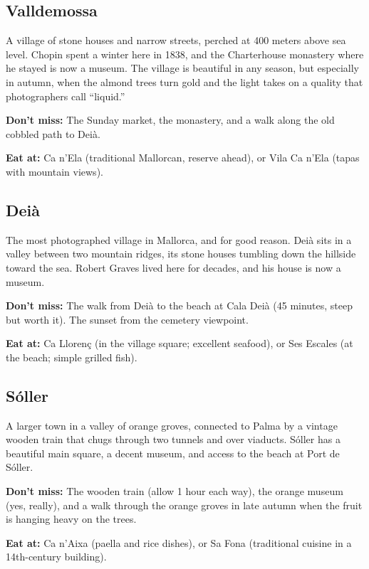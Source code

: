\documentclass[
    language=english,
    doctype=travel-guide,
    institution=none,
]{../../omnilatex}
\begin{document}
\subsection{Valldemossa}

A village of stone houses and narrow streets, perched at 400 meters above sea level. Chopin spent a winter here in 1838, and the Charterhouse monastery where he stayed is now a museum. The village is beautiful in any season, but especially in autumn, when the almond trees turn gold and the light takes on a quality that photographers call ``liquid.''

\textbf{Don't miss:} The Sunday market, the monastery, and a walk along the old cobbled path to Dei\`{a}.

\textbf{Eat at:} Ca n'Ela (traditional Mallorcan, reserve ahead), or Vila Ca n'Ela (tapas with mountain views).

\subsection{Dei\`{a}}

The most photographed village in Mallorca, and for good reason. Dei\`{a} sits in a valley between two mountain ridges, its stone houses tumbling down the hillside toward the sea. Robert Graves lived here for decades, and his house is now a museum.

\textbf{Don't miss:} The walk from Dei\`{a} to the beach at Cala Dei\`{a} (45 minutes, steep but worth it). The sunset from the cemetery viewpoint.

\textbf{Eat at:} Ca Lloren\c{c} (in the village square; excellent seafood), or Ses Escales (at the beach; simple grilled fish).

\subsection{S\'{o}ller}

A larger town in a valley of orange groves, connected to Palma by a vintage wooden train that chugs through two tunnels and over viaducts. S\'{o}ller has a beautiful main square, a decent museum, and access to the beach at Port de S\'{o}ller.

\textbf{Don't miss:} The wooden train (allow 1 hour each way), the orange museum (yes, really), and a walk through the orange groves in late autumn when the fruit is hanging heavy on the trees.

\textbf{Eat at:} Ca n'Aixa (paella and rice dishes), or Sa Fona (traditional cuisine in a 14th-century building).
\end{document}
